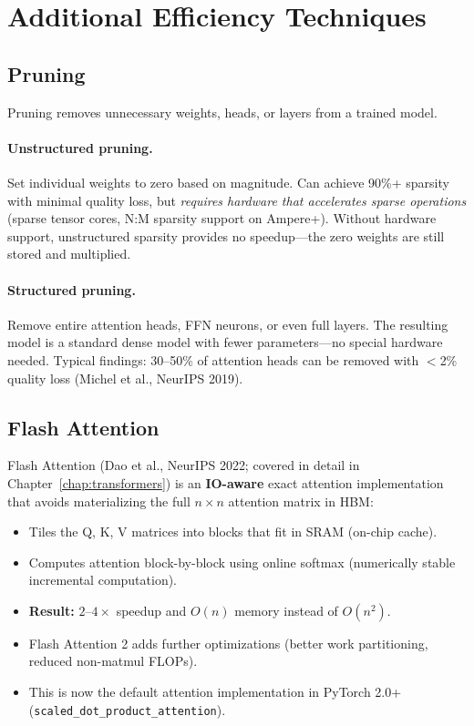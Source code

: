 \section{Additional Efficiency Techniques}
\label{sec:efficiency}

\subsection{Pruning}

Pruning removes unnecessary weights, heads, or layers from a trained model.

\paragraph{Unstructured pruning.}
Set individual weights to zero based on magnitude.  Can achieve 90\%+ sparsity with
minimal quality loss, but \emph{requires hardware that accelerates sparse operations}
(sparse tensor cores, N:M sparsity support on Ampere+).  Without hardware support,
unstructured sparsity provides no speedup---the zero weights are still stored and
multiplied.

\paragraph{Structured pruning.}
Remove entire attention heads, FFN neurons, or even full layers.  The resulting model
is a standard dense model with fewer parameters---no special hardware needed.  Typical
findings: 30--50\% of attention heads can be removed with $<$2\% quality loss
(Michel et al., NeurIPS 2019).

\subsection{Flash Attention}

Flash Attention (Dao et al., NeurIPS 2022; covered in detail in Chapter~\ref{chap:transformers})
is an \textbf{IO-aware} exact attention implementation that avoids materializing the
full $n \times n$ attention matrix in HBM:
\begin{itemize}
    \item Tiles the Q, K, V matrices into blocks that fit in SRAM (on-chip cache).
    \item Computes attention block-by-block using online softmax (numerically stable
          incremental computation).
    \item \textbf{Result:} $2$--$4\times$ speedup and $O(n)$ memory instead of $O(n^2)$.
    \item Flash Attention 2 adds further optimizations (better work partitioning,
          reduced non-matmul FLOPs).
    \item This is now the default attention implementation in PyTorch 2.0+
          (\texttt{scaled\_dot\_product\_attention}).
\end{itemize}

